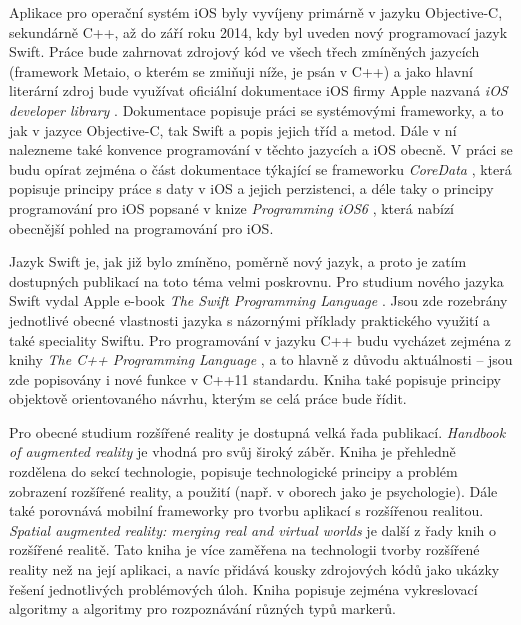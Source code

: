 \documentclass[oneside,12pt]{article}
\begin{document}
\def\,{\penalty10000\hskip.25em}
\pagestyle{headings}
\bakalarska
{}
\obsah
%
%
% 
Aplikace pro operační systém iOS byly vyvíjeny primárně v jazyku Objective-C, sekundárně C++, až do září roku 2014, kdy byl uveden nový programovací jazyk Swift. Práce bude zahrnovat zdrojový kód ve všech třech zmíněných jazycích (framework Metaio, o kterém se zmiňuji níže, je psán v C++) a jako hlavní literární zdroj bude využívat oficiální dokumentace iOS firmy Apple nazvaná \textit{iOS developer library} \cite{apple_library}. Dokumentace popisuje práci se systémovými frameworky, a to jak v jazyce Objective-C, tak Swift a popis jejich tříd a metod. Dále v ní nalezneme také konvence programování v těchto jazycích a iOS obecně. V práci se budu opírat zejména o část dokumentace týkající se frameworku \textit{CoreData} \cite{core_data}, která popisuje principy práce s daty v iOS a jejich perzistenci, a déle taky o principy programování pro iOS popsané v knize \textit{Programming iOS6} \cite{neuburg}, která nabízí obecnější pohled na programování pro iOS.

Jazyk Swift je, jak již bylo zmíněno, poměrně nový jazyk, a proto je zatím dostupných publikací na toto téma velmi poskrovnu. Pro studium nového jazyka Swift vydal Apple e-book \textit{The Swift Programming Language} \cite{swift}. Jsou zde rozebrány jednotlivé obecné vlastnosti jazyka s názornými příklady praktického využití a také speciality Swiftu.
Pro programování v jazyku C++ budu vycházet zejména z knihy \textit{The C++ Programming Language} \cite{c++}, a to hlavně z důvodu aktuálnosti -- jsou zde popisovány i nové funkce v C++11 standardu. Kniha také popisuje principy objektově orientovaného návrhu, kterým se celá práce bude řídit.

Pro obecné studium rozšířené reality je dostupná velká řada publikací. \textit{Handbook of augmented reality} \cite{furht} je vhodná pro svůj široký záběr. Kniha je přehledně rozdělena do sekcí technologie, popisuje technologické principy a problém zobrazení rozšířené reality, a použití (např. v oborech jako je psychologie). Dále také porovnává mobilní frameworky pro tvorbu aplikací s rozšířenou realitou. \textit{Spatial augmented reality: merging real and virtual worlds} \cite{bimber} je další z řady knih o rozšířené realitě. Tato kniha je více zaměřena na technologii tvorby rozšířené reality než na její aplikaci, a navíc přidává kousky zdrojových kódů jako ukázky řešení jednotlivých problémových úloh. Kniha popisuje zejména vykreslovací algoritmy a algoritmy pro rozpoznávání různých typů markerů. 
\end{document}
